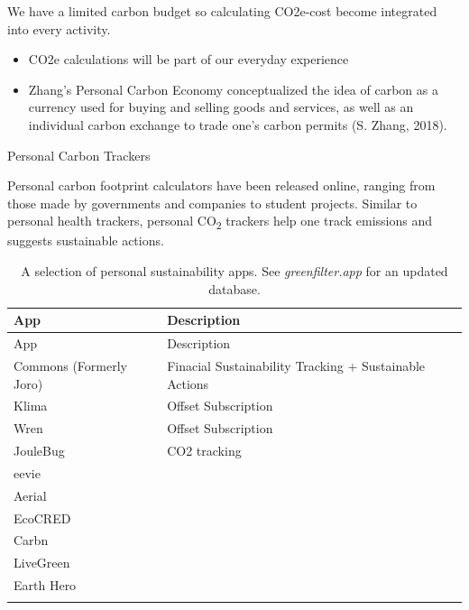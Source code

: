 \documentclass[
  letterpaper,
  DIV=11,
  numbers=noendperiod]{scrartcl}
\begin{document}
We have a limited carbon budget so calculating CO2e-cost become
integrated into every activity.

\begin{itemize}
\item
  CO2e calculations will be part of our everyday experience
\item
  Zhang's Personal Carbon Economy conceptualized the idea of carbon as a
  currency used for buying and selling goods and services, as well as an
  individual carbon exchange to trade one's carbon permits (S. Zhang,
  2018).
\end{itemize}

Personal Carbon Trackers

Personal carbon footprint calculators have been released online, ranging
from those made by governments and companies to student projects.
Similar to personal health trackers, personal CO\textsubscript{2}
trackers help one track emissions and suggests sustainable actions.

\begin{longtable}[]{@{}
  >{\raggedright\arraybackslash}p{}
  >{\raggedright\arraybackslash}p{}@{}}
\caption{A selection of personal sustainability apps. See
\emph{greenfilter.app} for an updated database.}\tabularnewline
\toprule\noalign{}
\begin{minipage}[b]{\linewidth}\raggedright
App
\end{minipage} & \begin{minipage}[b]{\linewidth}\raggedright
Description
\end{minipage} \\
\midrule\noalign{}
\endfirsthead
\toprule\noalign{}
\begin{minipage}[b]{\linewidth}\raggedright
App
\end{minipage} & \begin{minipage}[b]{\linewidth}\raggedright
Description
\end{minipage} \\
\midrule\noalign{}
\endhead
\bottomrule\noalign{}
\endlastfoot
Commons (Formerly Joro) & Finacial Sustainability Tracking + Sustainable
Actions \\
Klima & Offset Subscription \\
Wren & Offset Subscription \\
JouleBug & CO2 tracking \\
eevie & \\
Aerial & \\
EcoCRED & \\
Carbn & \\
LiveGreen & \\
Earth Hero & \\
& \\
\end{longtable}
\end{document}
